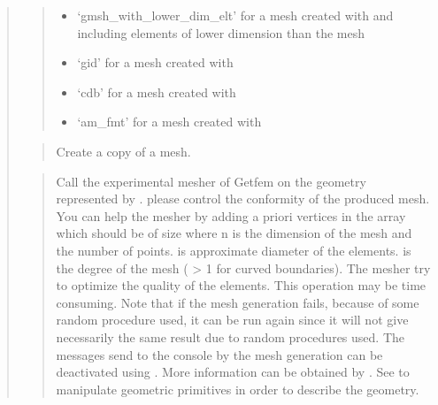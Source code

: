 \documentclass[a4paper,11pt,english]{sphinxmanual}
\begin{document}
\begin{quote}
\begin{quote}
\begin{itemize}
\item {} 
\sphinxAtStartPar
‘gmsh\_with\_lower\_dim\_elt’ for a mesh created with  and including elements of lower dimension than the mesh

\item {} 
\sphinxAtStartPar
‘gid’ for a mesh created with 

\item {} 
\sphinxAtStartPar
‘cdb’ for a mesh created with 

\item {} 
\sphinxAtStartPar
‘am\_fmt’ for a mesh created with 

\end{itemize}
\end{quote}

\sphinxAtStartPar
{}
\begin{quote}

\sphinxAtStartPar
Create a copy of a mesh.
\end{quote}

\sphinxAtStartPar
{}
\begin{quote}

\sphinxAtStartPar
Call the experimental mesher of Getfem on the geometry
represented by . please control the conformity of the produced mesh.
You can help the mesher by adding a priori vertices in the array
 which should be of size  where  n is the
dimension of the mesh and  the number of points.  is
approximate diameter of the elements.  is the degree of the
mesh ( \textgreater{} 1 for curved boundaries).  The mesher try to optimize the
quality of the elements. This operation may be time consuming.
Note that if the mesh generation fails, because of some random
procedure used, it can be run again since it will not give necessarily
the same result due to random procedures used.
The messages send to the console by the mesh generation can be
deactivated using . More information
can be obtained by . See 
to manipulate geometric primitives in order to describe the geometry.
\end{quote}
\end{quote}
\end{document}
